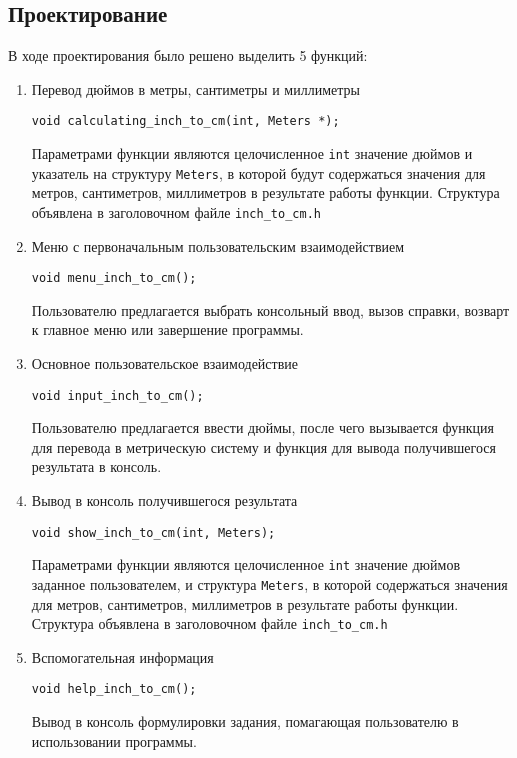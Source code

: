 \documentclass[12pt,a4paper]{report}
\begin{document}
\subsection{Проектирование}
\hspace{\parindent}В ходе проектирования было решено выделить 5 функций:
\begin{enumerate}
 	\item Перевод дюймов в метры, сантиметры и миллиметры
 	
 	\verb+void calculating_inch_to_cm(int, Meters *);+
 	
	Параметрами функции являются целочисленное \verb+int+ значение дюймов и указатель на структуру \verb+Meters+, в которой будут содержаться значения для метров, сантиметров, миллиметров в результате работы функции.
Структура объявлена в заголовочном файле \verb+inch_to_cm.h+		 
		 
		 
	\item Меню с первоначальным пользовательским взаимодействием
	
	\verb+void menu_inch_to_cm();+
	
	Пользователю предлагается выбрать консольный ввод, вызов справки, возварт к главное меню или завершение программы.	
		 
		 
	\item Основное пользовательское взаимодействие
	
	\verb+void input_inch_to_cm();+

	Пользователю предлагается ввести дюймы, после чего вызывается функция для перевода в метрическую систему и функция для вывода получившегося результата в консоль.
	
	
	\item Вывод в консоль получившегося результата
	
	\verb+void show_inch_to_cm(int, Meters);+

	Параметрами функции являются целочисленное \verb+int+ значение дюймов заданное пользователем, и структура \verb+Meters+, в которой содержаться значения для метров, сантиметров, миллиметров в результате работы функции.
Структура объявлена в заголовочном файле \verb+inch_to_cm.h+	
	
	
	\item Вспомогательная информация
	
	\verb+void help_inch_to_cm();+
	
	Вывод в консоль формулировки задания, помагающая пользователю в использовании программы.
\end{enumerate}
\end{document}
